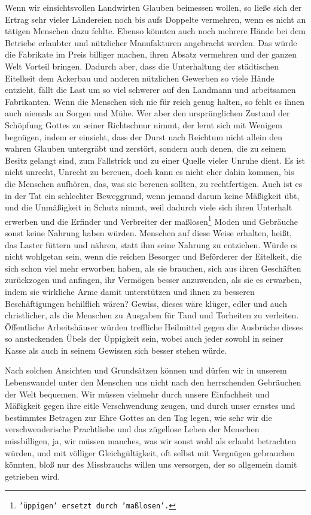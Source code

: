 {Wenn wir einsichtsvollen
Landwirten Glauben beimessen wollen, so ließe sich der
Ertrag sehr vieler Ländereien noch bis aufs Doppelte vermehren, wenn es nicht an
tätigen Menschen dazu fehlte. Ebenso könnten auch noch mehrere Hände bei dem
Betriebe erlaubter und nützlicher Manufakturen angebracht werden. Das würde die
Fabrikate im Preis billiger machen, ihren Absatz vermehren und der ganzen Welt
Vorteil bringen. Dadurch aber, dass die Unterhaltung der städtischen Eitelkeit
dem Ackerbau und anderen nützlichen Gewerben so viele Hände entzieht, fällt die
Last um so viel schwerer auf den Landmann und arbeitsamen Fabrikanten. Wenn die
Menschen sich nie für reich genug halten, so fehlt es ihnen auch niemals an
Sorgen und Mühe. Wer aber den ursprünglichen Zustand der Schöpfung Gottes zu
seiner Richtschnur nimmt, der lernt sich mit Wenigem begnügen, indem er
einsieht, dass der Durst nach Reichtum nicht allein den wahren
Glauben
untergräbt und zerstört, sondern auch denen, die zu seinem Besitz gelangt
sind, zum Fallstrick und zu einer Quelle vieler Unruhe dient. Es ist nicht
unrecht, Unrecht zu bereuen, doch kann es nicht eher dahin kommen, bis die
Menschen aufhören, das, was sie bereuen sollten, zu rechtfertigen. Auch ist es
in der Tat ein schlechter Beweggrund, wenn jemand darum keine Mäßigkeit übt,
und die Unmäßigkeit in Schutz nimmt, weil dadurch viele sich ihren Unterhalt
erwerben und die Erfinder und Verbreiter der maßlosen\footnote{\texttt{'üppigen'
ersetzt durch 'maßlosen'.}} Moden und Gebräuche sonst
keine Nahrung haben würden. Menschen auf diese Weise erhalten, heißt, das Laster
füttern und nähren, statt ihm seine Nahrung zu entziehen. Würde es nicht
wohlgetan sein, wenn die reichen Besorger und Beförderer der Eitelkeit, die
sich schon viel mehr erworben haben, als sie brauchen, sich aus ihren
Geschäften
zurückzogen und anfingen, ihr Vermögen besser anzuwenden, als sie es erwarben,
indem sie wirkliche Arme damit unterstützen und ihnen zu besseren
Beschäftigungen
behilflich wären? Gewiss, dieses wäre klüger, edler und auch christlicher, als
die
Menschen zu Ausgaben für Tand und Torheiten zu verleiten. Öffentliche
Arbeitshäuser würden treffliche Heilmittel gegen die
Ausbrüche dieses so
ansteckenden Übels der Üppigkeit sein, wobei auch jeder sowohl in seiner Kasse
als auch in seinem Gewissen sich besser stehen würde.

\medskip

Nach solchen Ansichten und Grundsätzen können und dürfen wir in unserem
Lebenswandel unter den Menschen uns nicht nach den herrschenden Gebräuchen der
Welt bequemen. Wir müssen vielmehr durch unsere Einfachheit und Mäßigkeit gegen
ihre eitle Verschwendung zeugen, und durch unser ernstes und
bestimmtes Betragen
zur Ehre Gottes an den Tag legen, wie sehr wir die verschwenderische Prachtliebe
und das zügellose Leben der Menschen missbilligen, ja, wir müssen manches, was
wir sonst wohl als erlaubt betrachten würden, und mit völliger Gleichgültigkeit,
oft selbst mit Vergnügen gebrauchen könnten, bloß nur des Missbrauchs willen uns
versorgen, der so allgemein damit getrieben wird.

}
